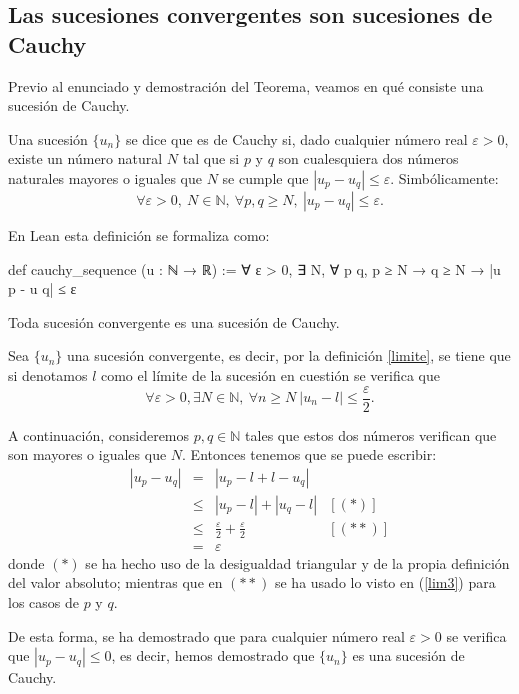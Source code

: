 \subsection{Las sucesiones convergentes son sucesiones de Cauchy}
Previo al enunciado y demostración del Teorema, veamos en qué
consiste una sucesión de Cauchy.
\begin{definicion}
  Una sucesión \(\{u_n\}\) se dice que es de Cauchy si,
  dado cualquier número real \(ε >0\),
  existe un número natural \(N\) tal que si \(p\) y \(q\) son
  cualesquiera dos números naturales mayores o iguales que
  \(N\) se cumple que \(|u_p-u_q| ≤ ε \).
  Simbólicamente:
  \begin{equation}
  ∀ ε > 0, \  N ∈ ℕ, \ ∀ p, q ≥ N, \ |u_p-u_q| ≤ ε.
  \end{equation}
\end{definicion}
En Lean esta definición se formaliza como:
\begin{leancode}
def cauchy_sequence (u : ℕ → ℝ) :=
∀ ε > 0, ∃ N, ∀ p q, p ≥ N → q ≥ N → |u p - u q| ≤ ε
\end{leancode}
\begin{teorema}
  Toda sucesión convergente es una sucesión de Cauchy.
\end{teorema}
\begin{demostracion}
  Sea \(\{u_n\}\) una sucesión convergente, es decir,
  por la definición \ref{limite}, se tiene que si denotamos
  \(l\) como el límite de la sucesión en cuestión se verifica que
\begin{equation}\label{lim3}
  ∀ ε >0, ∃ N ∈ ℕ, \  ∀ n ≥ N \ |u_n-l| ≤ \frac{ε}{2}.
\end{equation}

  A continuación, consideremos \(p,q ∈ ℕ\) tales
  que estos dos números verifican que son mayores o iguales
  que \(N\). Entonces tenemos que se puede escribir:
  \[\begin{array}{llll}
  	  |u_p-u_q| &= &|u_p-l+l-u_q|   & \\
  		   &≤ &|u_p-l|+|u_q-l| & [(*)] \\
  		   &≤ &\frac{ε}{2}+\frac{ε}{2} & [(**)] \\
  		   &= &ε
  \end{array}\]
  donde \( (*) \) se ha hecho uso de la desigualdad triangular y de
  la propia definición del valor absoluto; mientras que en \((**)\)
  se ha usado lo visto en (\ref{lim3}) para los casos de \(p\) y \(q\).

  De esta forma, se ha demostrado que para cualquier número real \(ε >0\)
  se verifica que \(|u_p-u_q| ≤ 0\), es decir, hemos demostrado
  que \(\{u_n\}\) es una sucesión de Cauchy.
\end{demostracion}

